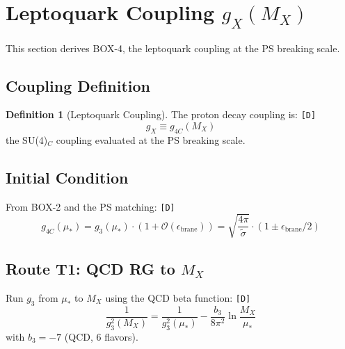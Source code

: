 \documentclass[11pt,a4paper]{article}
\newcommand{\tagD}{\textcolor{green!50!black}{\texttt{[D]}}}
\theoremstyle{definition}
\newtheorem{definition}{Definition}[section]
\begin{document}
\section{Leptoquark Coupling $g_X(M_X)$}
\label{sec:coupling-lane}

This section derives BOX-4, the leptoquark coupling at the PS breaking scale.

\subsection{Coupling Definition}
\label{subsec:coupling-def}

\begin{definition}[Leptoquark Coupling]
\label{def:leptoquark-coupling}
The proton decay coupling is: \tagD{}
\begin{equation}
\label{eq:gx-def}
g_X \equiv g_{4C}(M_X)
\end{equation}
the SU(4)$_C$ coupling evaluated at the PS breaking scale.
\end{definition}

\subsection{Initial Condition}
\label{subsec:initial-condition}

From BOX-2 and the PS matching: \tagD{}
\begin{equation}
\label{eq:g4c-mustar}
g_{4C}(\mu_*) = g_3(\mu_*) \cdot (1 + \mathcal{O}(\epsilon_{\text{brane}})) = \sqrt{\frac{4\pi}{\tilde{\sigma}}} \cdot (1 \pm \epsilon_{\text{brane}}/2)
\end{equation}

\subsection{Route T1: QCD RG to $M_X$}
\label{subsec:route-t1}

\begin{routebox}
Run $g_3$ from $\mu_*$ to $M_X$ using the QCD beta function: \tagD{}
\begin{equation}
\label{eq:route-t1}
\frac{1}{g_3^2(M_X)} = \frac{1}{g_3^2(\mu_*)} - \frac{b_3}{8\pi^2} \ln\frac{M_X}{\mu_*}
\end{equation}
with $b_3 = -7$ (QCD, 6 flavors).
\end{routebox}
\end{document}

